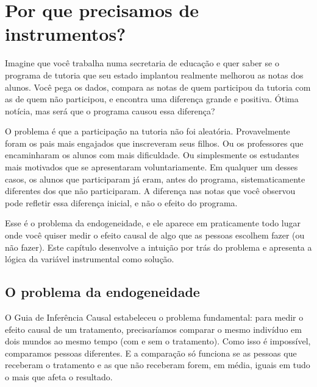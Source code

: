 
\chapter{Por que precisamos de instrumentos?}
\label{cap:introducao}

Imagine que você trabalha numa secretaria de educação e quer saber se o programa de tutoria que seu estado implantou realmente melhorou as notas dos alunos. Você pega os dados, compara as notas de quem participou da tutoria com as de quem não participou, e encontra uma diferença grande e positiva. Ótima notícia, mas será que o programa causou essa diferença?

O problema é que a participação na tutoria não foi aleatória. Provavelmente foram os pais mais engajados que inscreveram seus filhos. Ou os professores que encaminharam os alunos com mais dificuldade. Ou simplesmente os estudantes mais motivados que se apresentaram voluntariamente. Em qualquer um desses casos, os alunos que participaram já eram, antes do programa, sistematicamente diferentes dos que não participaram. A diferença nas notas que você observou pode refletir essa diferença inicial, e não o efeito do programa.

Esse é o problema da endogeneidade, e ele aparece em praticamente todo lugar onde você quiser medir o efeito causal de algo que as pessoas escolhem fazer (ou não fazer). Este capítulo desenvolve a intuição por trás do problema e apresenta a lógica da variável instrumental como solução.

\section{O problema da endogeneidade}
\label{sec:endogeneidade}

O Guia de Inferência Causal estabeleceu o problema fundamental: para medir o efeito causal de um tratamento, precisaríamos comparar o mesmo indivíduo em dois mundos ao mesmo tempo (com e sem o tratamento). Como isso é impossível, comparamos pessoas diferentes. E a comparação só funciona se as pessoas que receberam o tratamento e as que não receberam forem, em média, iguais em tudo o mais que afeta o resultado.

